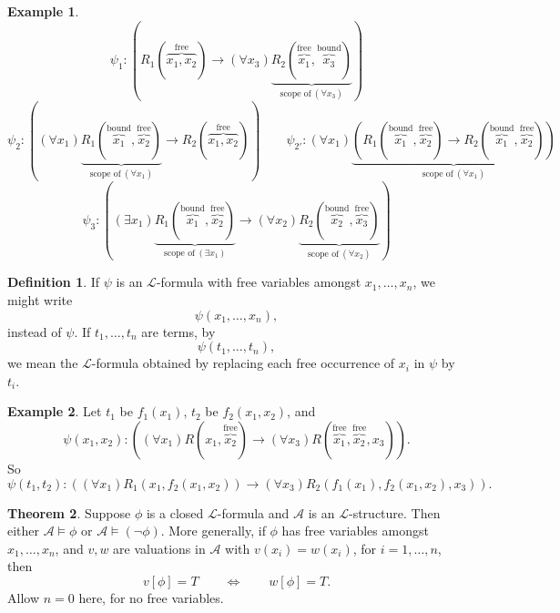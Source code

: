 \documentclass{article}
\newcommand{\A}{\mathcal{A}}
\renewcommand{\L}{\mathcal{L}}
\newcommand{\rb}[1]{\left( #1 \right)}
\renewcommand{\sb}[1]{\left[ #1 \right]}
\newcommand{\notb}[1]{\rb{\neg #1}}
\newcommand{\impb}[2]{\rb{#1 \rightarrow #2}}
\newcommand{\fab}[1]{\rb{\forall #1}}
\newcommand{\teb}[1]{\rb{\exists #1}}
\theoremstyle{definition}\newtheorem{definition}{Definition}[subsection]
\theoremstyle{definition}\newtheorem{remark1}[definition]{Remark}
\theoremstyle{definition}\newtheorem{example1}[definition]{Example}
\theoremstyle{definition}\newtheorem*{remark2}{Remark}
\theoremstyle{definition}\newtheorem*{example2}{Example}
\theoremstyle{definition}\newtheorem*{note}{Note}
\theoremstyle{definition}\newtheorem*{notation}{Notation}
\newtheorem{theorem}[definition]{Theorem}
\begin{document}
\begin{example2}
$$ \psi_1 : \impb{R_1\rb{\overbrace{x_1, x_2}^{\text{free}}}}{\fab{x_3}\underbrace{R_2\rb{\overbrace{x_1}^{\text{free}}, \overbrace{x_3}^{\text{bound}}}}_{\text{scope of} \ \fab{x_3}}} $$
$$ \psi_2 : \impb{\fab{x_1}\underbrace{R_1\rb{\overbrace{x_1}^{\text{bound}}, \overbrace{x_2}^{\text{free}}}}_{\text{scope of} \ \fab{x_1}}}{R_2\rb{\overbrace{x_1, x_2}^{\text{free}}}} \qquad \psi_{2'} : \fab{x_1}\underbrace{\impb{R_1\rb{\overbrace{x_1}^{\text{bound}}, \overbrace{x_2}^{\text{free}}}}{R_2\rb{\overbrace{x_1}^{\text{bound}}, \overbrace{x_2}^{\text{free}}}}}_{\text{scope of} \ \fab{x_1}} $$
$$ \psi_3 : \impb{\teb{x_1}\underbrace{R_1\rb{\overbrace{x_1}^{\text{bound}}, \overbrace{x_2}^{\text{free}}}}_{\text{scope of} \ \teb{x_1}}}{\fab{x_2}\underbrace{R_2\rb{\overbrace{x_2}^{\text{bound}}, \overbrace{x_3}^{\text{free}}}}_{\text{scope of} \ \fab{x_2}}} $$
\end{example2}

\begin{definition}
If $ \psi $ is an $ \L $-formula with free variables amongst $ x_1, \dots, x_n $, we might write
$$ \psi\rb{x_1, \dots, x_n}, $$
instead of $ \psi $. If $ t_1, \dots, t_n $ are terms, by
$$ \psi\rb{t_1, \dots, t_n}, $$
we mean the $ \L $-formula obtained by replacing each free occurrence of $ x_i $ in $ \psi $ by $ t_i $.
\end{definition}

\begin{example2}
Let $ t_1 $ be $ f_1\rb{x_1} $, $ t_2 $ be $ f_2\rb{x_1, x_2} $, and
$$ \psi\rb{x_1, x_2} : \impb{\fab{x_1}R\rb{x_1, \overbrace{x_2}^{\text{free}}}}{\fab{x_3}R\rb{\overbrace{x_1}^{\text{free}}, \overbrace{x_2}^{\text{free}}, x_3}}. $$
So
$$ \psi\rb{t_1, t_2} : \impb{\fab{x_1}R_1\rb{x_1, f_2\rb{x_1, x_2}}}{\fab{x_3}R_2\rb{f_1\rb{x_1}, f_2\rb{x_1, x_2}, x_3}}. $$
\end{example2}

\pagebreak

\begin{theorem}
\label{thm:2.3.3}
Suppose $ \phi $ is a closed $ \L $-formula and $ \A $ is an $ \L $-structure. Then either $ \A \vDash \phi $ or $ \A \vDash \notb{\phi} $. More generally, if $ \phi $ has free variables amongst $ x_1, \dots, x_n $, and $ v, w $ are valuations in $ \A $ with $ v\rb{x_i} = w\rb{x_i} $, for $ i = 1, \dots, n $, then
$$ v\sb{\phi} = T \qquad \iff \qquad w\sb{\phi} = T. $$
Allow $ n = 0 $ here, for no free variables.
\end{theorem}
\end{document}
